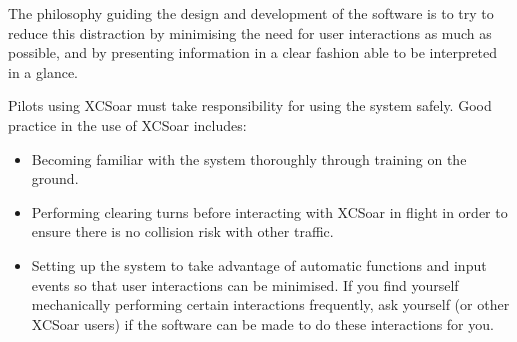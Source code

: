 The philosophy guiding the design and development of the software is
to try to reduce this distraction by minimising the need for user
interactions as much as possible, and by presenting information in a
clear fashion able to be interpreted in a glance.

Pilots using XCSoar must take responsibility for using the system safely.
Good practice in the use of XCSoar includes:
\begin{itemize}
\item Becoming familiar with the system thoroughly through training on 
  the ground.
\item Performing clearing turns before interacting with XCSoar in flight
  in order to ensure there is no collision risk with other traffic.
\item Setting up the system to take advantage of automatic functions
  and input events so that user interactions can be minimised.  If you
  find yourself mechanically performing certain interactions frequently,
  ask yourself (or other XCSoar users) if the software can be made to do 
  these interactions for you.
\end{itemize}

